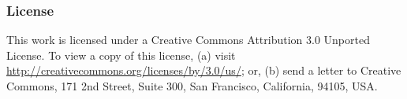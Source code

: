 \documentclass{beamer}
\begin{document}

\frame
{
  \frametitle{License}

  This work is licensed under a Creative Commons Attribution 3.0
  Unported License. To view a copy of this license, (a) visit
  \url{http://creativecommons.org/licenses/by/3.0/us/}; or, (b) send a
  letter to Creative Commons, 171 2nd Street, Suite 300, San Francisco,
  California, 94105, USA.
}
\end{document}

